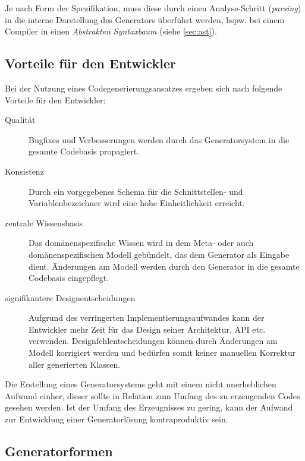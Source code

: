 Je nach Form der Spezifikation, muss diese durch einen Analyse-Schritt (\emph{parsing}) in die interne Darstellung des Generators überführt werden, bspw. bei einem Compiler in einen \emph{Abstrakten Syntaxbaum} (siehe \cref{sec:ast}).

\subsection{Vorteile für den Entwickler}
\label{sec:advantages_for_the_developer}

Bei der Nutzung eines Codegenerierungsansatzes ergeben sich nach \cite[][S. 15]{herrington2003code} folgende Vorteile für den Entwickler:

\begin{description}
    \item[Qualität]
        Bugfixes und Verbesserungen werden durch das Generatorsystem in die gesamte Codebasis propagiert.
    \item[Konsistenz]
        Durch ein vorgegebenes Schema für die Schnittstellen- und Variablenbezeichner wird eine hohe Einheitlichkeit erreicht.
    \item[zentrale Wissensbasis]
        Das domänenspezifische Wissen wird in dem Meta- oder auch domänenspezifischen Modell gebündelt, das dem Generator als Eingabe dient. Änderungen am Modell werden durch den Generator in die gesamte Codebasis eingepflegt.
    \item[signifikantere Designentscheidungen]
        Aufgrund des verringerten Implementierungsaufwandes kann der Entwickler mehr Zeit für das Design seiner Architektur, \gls{API} etc. verwenden. Designfehlentscheidungen können durch Änderungen am Modell korrigiert werden und bedürfen somit keiner manuellen Korrektur aller generierten Klassen.
\end{description}

Die Erstellung eines Generatorsystems geht mit einem nicht unerheblichen Aufwand einher, dieser sollte in Relation zum Umfang des zu erzeugenden Codes gesehen werden.
Ist der Umfang des Erzeugnisses zu gering, kann der Aufwand zur Entwicklung einer Generatorlösung kontraproduktiv sein.

\subsection{Generatorformen}
\label{sec:generator_models}

